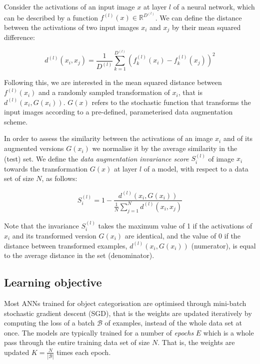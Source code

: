 {Consider the activations of an input image $x$ at layer $l$ of a neural network, which can be described by a function $f^{(l)}(x) \in \mathbb{R}^{D^{(l)}}$. We can define the distance between the activations of two input images $x_{i}$ and $x_{j}$ by their mean squared difference:

\begin{equation}
\label{eq:invariance-mse}
 d^{(l)}(x_{i}, x_{j}) = \frac{1}{D^{(l)}}\sum_{k=1}^{D^{(l)}}(f_{k}^{(l)}(x_{i}) - f_{k}^{(l)}(x_{j}))^2
\end{equation}

Following this, we are interested in the mean squared distance between $f^{(l)}(x_i)$ and a randomly sampled transformation of $x_i$, that is $d^{(l)}(x_{i}, G(x_{i}))$. $G(x)$ refers to the stochastic function that transforms the input images according to a pre-defined, parameterised data augmentation scheme.

In order to assess the similarity between the activations of an image $x_i$ and of its augmented versions $G(x_{i})$ we normalise it by the average similarity in the (test) set. We define the \textit{data augmentation invariance score} $S_{i}^{(l)}$ of image $x_i$ towards the transformation $G(x)$ at layer $l$ of a model, with respect to a data set of size $N$, as follows:

\begin{equation}
\label{eq:invariance-invariance}
 S_{i}^{(l)} = 1 - \frac{d^{(l)}(x_{i}, G(x_{i}))}{\frac{1}{N}\sum_{j=1}^{N}d^{(l)}(x_{i}, x_{j})}
\end{equation}

Note that the invariance $S_{i}^{(l)}$ takes the maximum value of 1 if the activations of $x_{i}$ and its transformed version $G(x_{i})$ are identical, and the value of 0 if the distance between transformed examples, $d^{(l)}(x_{i}, G(x_{i}))$ (numerator), is equal to the average distance in the set (denominator).

\subsection{Learning objective}
\label{sec:invariance-daug_invariance}
Most ANNs trained for object categorisation are optimised through mini-batch stochastic gradient descent (SGD), that is the weights are updated iteratively by computing the loss of a batch $\mathcal{B}$ of examples, instead of the whole data set at once. The models are typically trained for a number of \textit{epochs} $E$ which is a whole pass through the entire training data set of size $N$. That is, the weights are updated $K=\frac{N}{|\mathcal{B}|}$ times each epoch.

}
